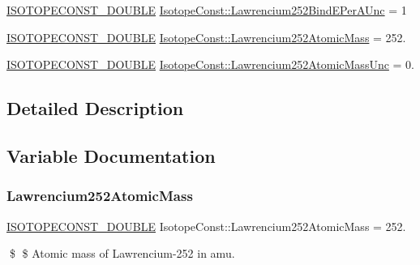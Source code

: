 \begin{DoxyCompactItemize}
\mbox{\hyperlink{group___isotope_const-_macros_ga8f45a7272ce02c0b4c65c44636ed719a}{I\+S\+O\+T\+O\+P\+E\+C\+O\+N\+S\+T\+\_\+\+D\+O\+U\+B\+LE}} \mbox{\hyperlink{group___isotope_const-_lawrencium-_lr252_ga664c6daae7fd4bea5f9334346696e02d}{Isotope\+Const\+::\+Lawrencium252\+Bind\+E\+Per\+A\+Unc}} = 1
\item 
\mbox{\hyperlink{group___isotope_const-_macros_ga8f45a7272ce02c0b4c65c44636ed719a}{I\+S\+O\+T\+O\+P\+E\+C\+O\+N\+S\+T\+\_\+\+D\+O\+U\+B\+LE}} \mbox{\hyperlink{group___isotope_const-_lawrencium-_lr252_ga1dec81fc705d79db654aee6b304be119}{Isotope\+Const\+::\+Lawrencium252\+Atomic\+Mass}} = 252.
\item 
\mbox{\hyperlink{group___isotope_const-_macros_ga8f45a7272ce02c0b4c65c44636ed719a}{I\+S\+O\+T\+O\+P\+E\+C\+O\+N\+S\+T\+\_\+\+D\+O\+U\+B\+LE}} \mbox{\hyperlink{group___isotope_const-_lawrencium-_lr252_gad41176cc454f231d09ce7f003f8ed46d}{Isotope\+Const\+::\+Lawrencium252\+Atomic\+Mass\+Unc}} = 0.
\end{DoxyCompactItemize}


\subsection{Detailed Description}


\subsection{Variable Documentation}
\mbox{\label{group___isotope_const-_lawrencium-_lr252_ga1dec81fc705d79db654aee6b304be119}} 
\subsubsection{\texorpdfstring{Lawrencium252\+Atomic\+Mass}{Lawrencium252AtomicMass}}
{\footnotesize\ttfamily \mbox{\hyperlink{group___isotope_const-_macros_ga8f45a7272ce02c0b4c65c44636ed719a}{I\+S\+O\+T\+O\+P\+E\+C\+O\+N\+S\+T\+\_\+\+D\+O\+U\+B\+LE}} Isotope\+Const\+::\+Lawrencium252\+Atomic\+Mass = 252.}

\$ \$ Atomic mass of Lawrencium-\/252 in amu. \mbox{\label{group___isotope_const-_lawrencium-_lr252_gad41176cc454f231d09ce7f003f8ed46d}} 
